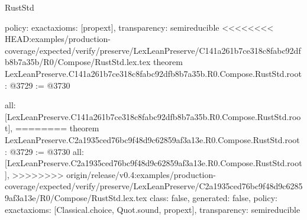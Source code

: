 \begin{lexlean}{RustStd}
\begin{coremodule}
{\begin{coremodule}
{{{{{{{  policy: exact{axioms: [propext]},
  transparency: semireducible
}
<<<<<<<< HEAD:examples/production-coverage/expected/verify/preserve/LexLeanPreserve/C141a261b7ce318c8fabc92dfb8b7a35b/R0/Compose/RustStd.lex.tex
theorem LexLeanPreserve.C141a261b7ce318c8fabc92dfb8b7a35b.R0.Compose.RustStd.root : @3729 := @3730 {
  all: [LexLeanPreserve.C141a261b7ce318c8fabc92dfb8b7a35b.R0.Compose.RustStd.root],
========
theorem LexLeanPreserve.C2a1935ced76bc9f48d9c62859af3a13e.R0.Compose.RustStd.root : @3729 := @3730 {
  all: [LexLeanPreserve.C2a1935ced76bc9f48d9c62859af3a13e.R0.Compose.RustStd.root],
>>>>>>>> origin/release/v0.4:examples/production-coverage/expected/verify/preserve/LexLeanPreserve/C2a1935ced76bc9f48d9c62859af3a13e/R0/Compose/RustStd.lex.tex
  class: false,
  generated: false,
  policy: exact{axioms: [Classical.choice, Quot.sound, propext]},
  transparency: semireducible
}

}}}}}}}
\end{coremodule}}
\end{coremodule}
\end{lexlean}
